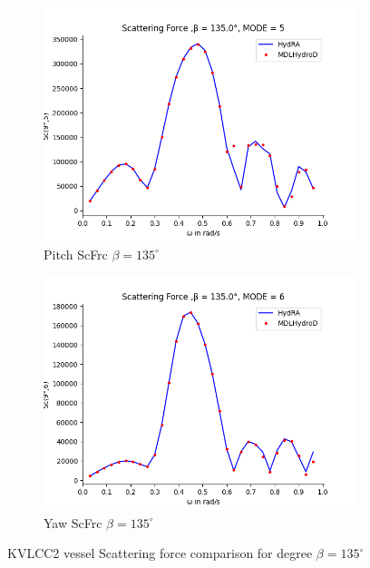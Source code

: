 \begin{figure}[H]
\begin{subfigure}[b]{0.45\textwidth}
        \includegraphics[width=\textwidth]{plots/kvlcc/sc/sc5.png}
        \caption{Pitch ScFrc $\beta = 135^{\circ}$}
    \end{subfigure}
    \begin{subfigure}[b]{0.45\textwidth}
        \includegraphics[width=\textwidth]{plots/kvlcc/sc/sc6.png}
        \caption{Yaw ScFrc $\beta = 135^{\circ}$}
    \end{subfigure}
    \caption{KVLCC2 vessel Scattering force comparison for degree $\beta= 135^{\circ}$}
    \label{fig:kvlcc_scattering}
\end{figure}

